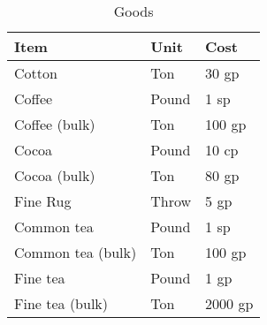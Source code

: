 \documentclass[oneside,11pt,english]{book}
\begin{document}
\begin{table}[hb]
  \centering
  \caption{Goods}
  \label{tab:Goods}
  \begin{tabu} spread 0pt {*{3}{X[-1]}}
    Item                             & Unit                                                                               & Cost                       \\\toprule
    Cotton                           & Ton                                                                                & 30 gp                      \\
    Coffee                           & Pound                                                                              & 1 sp                       \\
    Coffee (bulk)                    & Ton                                                                                & 100 gp                     \\
    Cocoa                            & Pound                                                                              & 10 cp                      \\
    Cocoa (bulk)                     & Ton                                                                                & 80 gp                      \\
    Fine Rug                         & Throw                                                                              & 5 gp                       \\
    Common tea                       & Pound                                                                              & 1 sp                       \\
    Common tea (bulk)                & Ton                                                                                & 100 gp                     \\
    Fine tea                         & Pound                                                                              & 1 gp                       \\
    Fine tea (bulk)                  & Ton                                                                                & 2000 gp                    \\
  \end{tabu}
\end{table}
\clearpage
\end{document}

